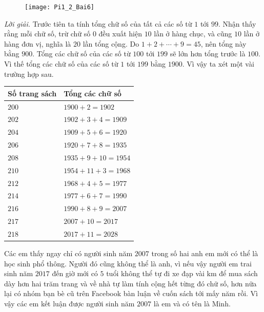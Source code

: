\begin{multicols}{2}
	\begin{figure}[H]
		\centering
		\vspace*{-5pt}
		\captionsetup{labelformat= empty, justification=centering}
		\texttt{[image: Pi1\_2\_Bai6]}
		\vspace*{-10pt}
	\end{figure}
	\textit{Lời giải.} 	Trước tiên ta tính tổng chữ số của tất cả các số từ $1$ tới $99$. Nhận thấy rằng mỗi chữ số, trừ chữ số $0$ đều xuất hiện $10$ lần ở hàng chục, và cũng $10$ lần ở hàng đơn vị, nghĩa là $20$ lần tổng cộng. Do $1+2+ \cdots+9=45$, nên tổng này bằng  $900$. Tổng các chữ số của các số từ $100$ tới $199$ sẽ lớn hơn tổng trước là $100$. Vì thế tổng các chữ số của các số từ $1$ tới $199$ bằng $1900$. Vì vậy ta xét một vài trường hợp sau.
	\begin{table}[H]
		\centering
		\vspace*{-5pt}
		\captionsetup{labelformat= empty, justification=centering}
		\renewcommand{\arraystretch}{1.05}
		\begin{tabular}{|l|l|}
			\hline
			\textbf{Số trang sách}&	\textbf{Tổng các chữ số}\\
			\hline
			$200$&	$1900+2 =1902$\\
			\hline
			$202$&	$1902+3+4=1909$\\
			\hline
			$204$&	$1909+5+6=1920$\\
			\hline
			$206$&	$1920+7+8=1935$\\
			\hline
			$208$&	$1935+9+10=1954$\\
			\hline
			$210$&	$1954+11+3=1968$\\
			\hline
			$212$&	$1968+4+5=1977$\\
			\hline
			$214$&	$1977+6+7=1990$\\
			\hline
			$216$&	$1990+8+9=2007$\\
			\hline
			$217$&	$2007+10=2017$\\
			\hline
			$218$&	$2017+11=2028$\\
			\hline
		\end{tabular}
		\vspace*{-5pt}
	\end{table}
	Các em thấy ngay chỉ có người sinh năm $2007$ trong số hai anh em mới có thể là học sinh phổ thông. Người đó cũng không thể là anh, vì nếu vậy người em trai sinh năm $2017$ đến giờ mới có $5$ tuổi không thể tự đi xe đạp vài km để mua sách dày hơn hai trăm trang và về nhà tự làm tính cộng hết từng đó chữ số, hơn nữa lại có nhóm bạn bè cũ trên Facebook bàn luận về cuốn sách tới mấy năm rồi. Vì vậy các em kết luận được người sinh năm $2007$ là em và có tên là Minh.
\end{multicols}
